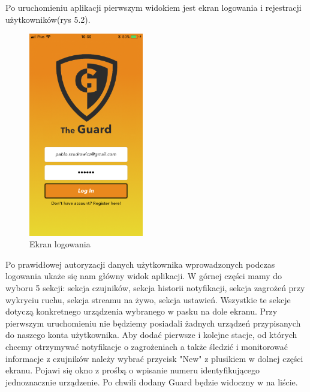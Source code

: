 Po uruchomieniu aplikacji pierwszym widokiem jest ekran logowania i rejestracji użytkowników(rys 5.2). 
\begin{figure}[h]
	\centering
	\includegraphics[width=5cm]{login.png}
	\caption{Ekran logowania}
\end{figure}
Po prawidłowej autoryzacji danych użytkownika wprowadzonych podczas logowania ukaże się nam główny widok aplikacji. W górnej części mamy do wyboru 5 sekcji:
sekcja czujników, sekcja historii notyfikacji, sekcja zagrożeń przy wykryciu ruchu, sekcja streamu na żywo, sekcja ustawień. Wszystkie te sekcje dotyczą konkretnego urządzenia wybranego w pasku na dole ekranu. Przy pierwszym uruchomieniu nie będziemy posiadali żadnych urządzeń przypisanych do naszego konta użytkownika. Aby dodać pierwsze i kolejne stacje, od których chcemy otrzymywać notyfikacje o zagrożeniach a także śledzić i monitorować informacje z czujników należy wybrać przycisk "New" z plusikiem w dolnej części ekranu. Pojawi się okno z prośbą o wpisanie numeru identyfikującego jednoznacznie urządzenie. Po chwili dodany Guard będzie widoczny w na liście.
